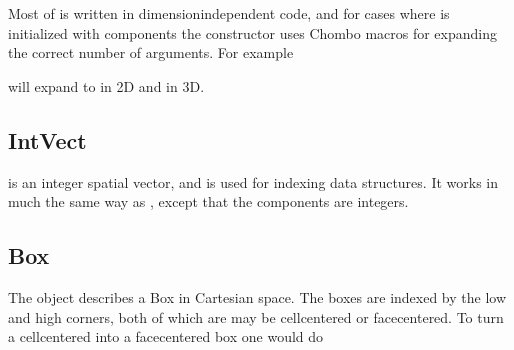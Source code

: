 \documentclass[letterpaper,10pt,english]{sphinxmanual}
\begin{document}
Most of  is written in dimension\sphinxhyphen{}independent code, and for cases where  is initialized with components the constructor uses Chombo macros for expanding the correct number of arguments.
For example

\begin{sphinxVerbatim}[commandchars=\\\{\},formatcom=\scriptsize]
   
\end{sphinxVerbatim}

will expand to  in 2D and  in 3D.


\subsection{IntVect}
\label{\detokenize{Basics:intvect}}
 is an integer spatial vector, and is used for indexing data structures.
It works in much the same way as , except that the components are integers.


\subsection{Box}
\label{\detokenize{Basics:box}}
The  object describes a Box in Cartesian space.
The boxes are indexed by the low and high corners, both of which are  may be cell\sphinxhyphen{}centered or face\sphinxhyphen{}centered.
To turn a cell\sphinxhyphen{}centered  into a face\sphinxhyphen{}centered box one would do

\begin{sphinxVerbatim}[commandchars=\\\{\},formatcom=\scriptsize]
   
                
\end{sphinxVerbatim}
\end{document}
